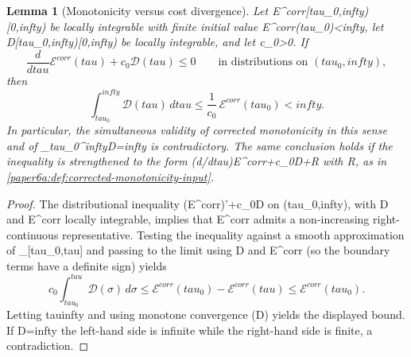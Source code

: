 \documentclass[11pt]{amsart}
\def\({}%
\def\){}%
\def\mathrm#1{#1}%
\def\tau{tau}%
\def\infty{infty}%
\theoremstyle{plain}
\newtheorem{lemma}[lemma]{Lemma}
\theoremstyle{definition}
\theoremstyle{remark}
\begin{document}
\begin{lemma}[Monotonicity versus cost divergence]
\label{paper6a:lem:corrected-monotonicity-versus-divergent-cost}
Let \(\mathcal E^{\mathrm{corr}}\colon[\tau_0,\infty)\to[0,\infty)\) be
locally integrable with finite initial value
\(\mathcal E^{\mathrm{corr}}(\tau_0)<\infty\), let
\(\mathcal D\colon[\tau_0,\infty)\to[0,\infty)\) be locally integrable, and
let \(c_0>0\).  If
\[
  \frac{d}{d\tau}\mathcal E^{\mathrm{corr}}(\tau)+c_0\mathcal D(\tau)\le 0
  \qquad\text{in distributions on }(\tau_0,\infty),
\]
then
\[
  \int_{\tau_0}^{\infty}\mathcal D(\tau)\,d\tau
  \le \frac{1}{c_0}\,\mathcal E^{\mathrm{corr}}(\tau_0)<\infty .
\]
In particular, the simultaneous validity of corrected monotonicity in this
sense and of \(\int_{\tau_0}^{\infty}\mathcal D=\infty\) is contradictory.
The same conclusion holds if the inequality is strengthened to the form
\((d/d\tau)\mathcal E^{\mathrm{corr}}+c_0\mathcal D+\mathcal R\) with
\(\mathcal R\), as in
\cref{paper6a:def:corrected-monotonicity-input}.
\end{lemma}

\begin{proof}
The distributional inequality
\((\mathcal E^{\mathrm{corr}})'+c_0\mathcal D\) on
\((\tau_0,\infty)\), with \(\mathcal D\) and
\(\mathcal E^{\mathrm{corr}}\) locally integrable, implies that
\(\mathcal E^{\mathrm{corr}}\) admits a non-increasing right-continuous
representative.  Testing the inequality against a smooth approximation of
\(_{[\tau_0,\tau]}\) and passing to the limit using
\(\mathcal D\) and \(\mathcal E^{\mathrm{corr}}\) (so the
boundary terms have a definite sign) yields
\[
  c_0\int_{\tau_0}^{\tau}\mathcal D(\sigma)\,d\sigma
  \le \mathcal E^{\mathrm{corr}}(\tau_0)-\mathcal E^{\mathrm{corr}}(\tau)
  \le \mathcal E^{\mathrm{corr}}(\tau_0).
\]
Letting \(\tau\to\infty\) and using monotone convergence
(\(\mathcal D\)) yields the displayed bound.  If
\(\int\mathcal D=\infty\) the left-hand side is infinite while the
right-hand side is finite, a contradiction.
\end{proof}
\end{document}
